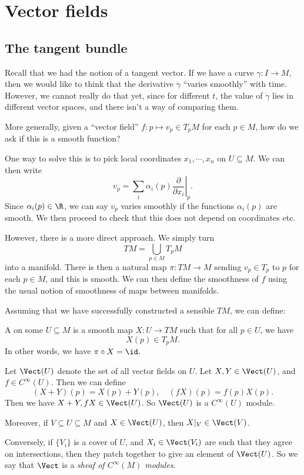 \documentclass[a4paper]{article}
\begin{document}
\section{Vector fields}
\subsection{The tangent bundle}
Recall that we had the notion of a tangent vector. If we have a curve $\gamma: I \to M$, then we would like to think that the derivative $\dot{\gamma}$ ``varies smoothly'' with time. However, we cannot really do that yet, since for different $t$, the value of $\dot{\gamma}$ lies in different vector spaces, and there isn't a way of comparing them.

More generally, given a ``vector field'' $f: p \mapsto v_p \in T_p M$ for each $p \in M$, how do we ask if this is a smooth function?

One way to solve this is to pick local coordinates $x_1, \cdots,x _n$ on $U \subseteq M$. We can then write
\[
  v_p = \sum_i \alpha_i(p) \left.\frac{\partial}{\partial x_i}\right|_p.
\]
Since $\alpha_i(p) \in \R$, we can say $v_p$ varies smoothly if the functions $\alpha_i(p)$ are smooth. We then proceed to check that this does not depend on coordinates etc.

However, there is a more direct approach. We simply turn
\[
  TM = \bigcup_{p \in M} T_p M
\]
into a manifold. There is then a natural map $\pi: TM \to M$ sending $v_p \in T_p$ to $p$ for each $p \in M$, and this is smooth. We can then define the smoothness of $f$ using the usual notion of smoothness of maps between manifolds.

Assuming that we have successfully constructed a sensible $TM$, we can define:
\begin{defi}
  A  on some $U \subseteq M$ is a smooth map $X: U \to TM$ such that for all $p \in U$, we have
  \[
    X(p) \in T_p M.
  \]
  In other words, we have $\pi \circ X = \id$.
\end{defi}

\begin{defi}[$\Vect(U)$]
  Let $\Vect(U)$ denote the set of all vector fields on $U$. Let $X, Y \in \Vect(U)$, and $f \in C^\infty(U)$. Then we can define
  \[
    (X + Y)(p) = X(p) + Y(p),\quad (fX)(p) = f(p) X(p).
  \]
  Then we have $X + Y, fX \in \Vect(U)$. So $\Vect(U)$ is a $C^\infty(U)$ module.

  Moreover, if $V \subseteq U \subseteq M$ and $X \in \Vect(U)$, then $X|_V \in \Vect(V)$.

  Conversely, if $\{V_i\}$ is a cover of $U$, and $X_i \in \Vect(V_i)$ are such that they agree on intersections, then they patch together to give an element of $\Vect(U)$. So we say that $\Vect$ is a \emph{sheaf of $C^\infty(M)$ modules}.
\end{defi}
\end{document}
